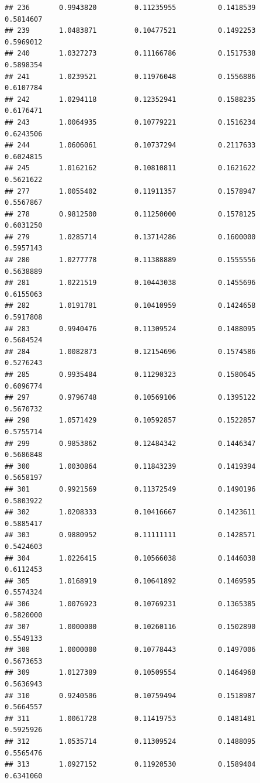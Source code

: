 \documentclass[]{article}
\begin{document}
\begin{verbatim}
## 236       0.9943820         0.11235955          0.1418539        0.5814607
## 239       1.0483871         0.10477521          0.1492253        0.5969012
## 240       1.0327273         0.11166786          0.1517538        0.5898354
## 241       1.0239521         0.11976048          0.1556886        0.6107784
## 242       1.0294118         0.12352941          0.1588235        0.6176471
## 243       1.0064935         0.10779221          0.1516234        0.6243506
## 244       1.0606061         0.10737294          0.2117633        0.6024815
## 245       1.0162162         0.10810811          0.1621622        0.5621622
## 277       1.0055402         0.11911357          0.1578947        0.5567867
## 278       0.9812500         0.11250000          0.1578125        0.6031250
## 279       1.0285714         0.13714286          0.1600000        0.5957143
## 280       1.0277778         0.11388889          0.1555556        0.5638889
## 281       1.0221519         0.10443038          0.1455696        0.6155063
## 282       1.0191781         0.10410959          0.1424658        0.5917808
## 283       0.9940476         0.11309524          0.1488095        0.5684524
## 284       1.0082873         0.12154696          0.1574586        0.5276243
## 285       0.9935484         0.11290323          0.1580645        0.6096774
## 297       0.9796748         0.10569106          0.1395122        0.5670732
## 298       1.0571429         0.10592857          0.1522857        0.5755714
## 299       0.9853862         0.12484342          0.1446347        0.5686848
## 300       1.0030864         0.11843239          0.1419394        0.5658197
## 301       0.9921569         0.11372549          0.1490196        0.5803922
## 302       1.0208333         0.10416667          0.1423611        0.5885417
## 303       0.9880952         0.11111111          0.1428571        0.5424603
## 304       1.0226415         0.10566038          0.1446038        0.6112453
## 305       1.0168919         0.10641892          0.1469595        0.5574324
## 306       1.0076923         0.10769231          0.1365385        0.5820000
## 307       1.0000000         0.10260116          0.1502890        0.5549133
## 308       1.0000000         0.10778443          0.1497006        0.5673653
## 309       1.0127389         0.10509554          0.1464968        0.5636943
## 310       0.9240506         0.10759494          0.1518987        0.5664557
## 311       1.0061728         0.11419753          0.1481481        0.5925926
## 312       1.0535714         0.11309524          0.1488095        0.5565476
## 313       1.0927152         0.11920530          0.1589404        0.6341060

\end{verbatim}
\end{document}
